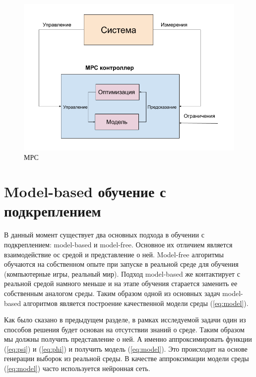 \begin{figure}[h]
	\centering
	\includegraphics[scale=0.7]{mpc_ex.png}
	\caption{МРС}\label{fig:mpc-ex}
\end{figure}




\section{Model-based обучение с подкреплением}\label{1sec:optimal-control}

В данный момент существует два основных подхода в обучении с подкреплением: model-based и model-free. Основное их отличием является взаимодействие ос средой и представление о ней. Model-free алгоритмы обучаются на собственном опыте при запуске в реальной среде для обучения (компьютерные игры, реальный мир). Подход model-based же контактирует с реальной средой намного меньше и на этапе обучения старается заменить ее собственным аналогом среды. Таким образом одной из основных задач model-based алгоритмов является построение качественной модели среды (\ref{eq:model}).

Как было сказано в предыдущем разделе, в рамках исследуемой задачи один из способов решения будет основан на отсутствии знаний о среде. Таким образом мы должны получить представление о ней. А именно аппроксимировать функции (\ref{eq:psi}) и (\ref{eq:phi}) и получить модель (\ref{eq:model}). Это происходит на основе генерации выборок из реальной среды. В качестве аппроксимации  модели среды (\ref{eq:model}) часто используется нейронная сеть.

